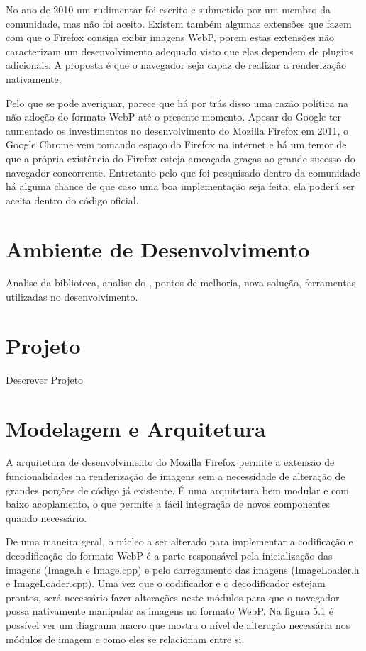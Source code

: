 \documentclass[espaco=simples,appendix=Name]{abnt}
\begin{document}
No ano de 2010 um  rudimentar foi escrito e submetido por um membro da comunidade, mas não foi aceito. Existem também algumas extensões que fazem com que o Firefox consiga exibir imagens WebP, porem estas extensões não caracterizam um desenvolvimento adequado visto que elas dependem de plugins adicionais. A proposta é que o navegador seja capaz de realizar a renderização nativamente.

Pelo que se pode averiguar, parece que há por trás disso uma razão política na não adoção do formato WebP até o presente momento. Apesar do Google ter aumentado os investimentos no desenvolvimento do Mozilla Firefox em 2011, o Google Chrome vem tomando espaço do Firefox na internet e há um temor de que a própria existência do Firefox esteja ameaçada graças ao grande sucesso do navegador concorrente. Entretanto pelo que foi pesquisado dentro da comunidade há alguma chance de que caso uma boa implementação seja feita, ela poderá ser aceita dentro do código oficial.

\section{Ambiente de Desenvolvimento}
Analise da biblioteca, analise do , pontos de melhoria, nova solução, ferramentas utilizadas no desenvolvimento.

\section{Projeto}

Descrever Projeto

\section{Modelagem e Arquitetura}

A arquitetura de desenvolvimento do Mozilla Firefox permite a extensão de funcionalidades na renderização de imagens sem a necessidade de alteração de grandes porções de código já existente. É uma arquitetura bem modular e com baixo acoplamento, o que permite a fácil integração de novos componentes quando necessário. 

De uma maneira geral, o núcleo a ser alterado para implementar a codificação e decodificação do formato WebP é a parte responsável pela inicialização das imagens (Image.h e Image.cpp) e pelo carregamento das imagens (ImageLoader.h e ImageLoader.cpp). Uma vez que o codificador e o decodificador estejam prontos, será necessário fazer alterações neste módulos para que o navegador possa nativamente manipular as imagens no formato WebP. Na figura 5.1 é possível ver um diagrama macro que mostra o nível de alteração necessária nos módulos de imagem e como eles se relacionam entre si.
\end{document}
